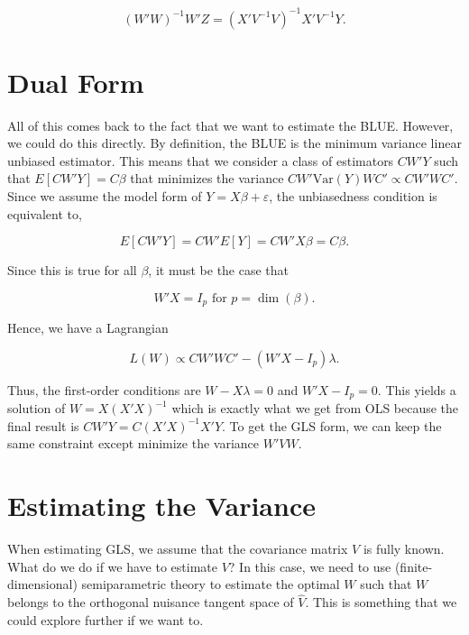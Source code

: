 \documentclass[
  letterpaper,
  DIV=11,
  numbers=noendperiod]{scrartcl}
\newcommand{\Var}{{\text{Var}}}
\begin{document}
\[ (W'W)^{-1} W'Z = (X'V^{-1}V)^{-1} X'V^{-1}Y.\]

\hypertarget{dual-form}{%
\section{Dual Form}\label{dual-form}}

All of this comes back to the fact that we want to estimate the BLUE.
However, we could do this directly. By definition, the BLUE is the
minimum variance linear unbiased estimator. This means that we consider
a class of estimators \(CW'Y\) such that \(E[CW'Y] = C\beta\) that
minimizes the variance \(CW'\Var(Y) WC' \propto CW'WC'\). Since we
assume the model form of \(Y = X\beta + \varepsilon\), the unbiasedness
condition is equivalent to,

\[ E[CW'Y] = CW'E[Y] = CW'X\beta = C\beta. \]

Since this is true for all \(\beta\), it must be the case that

\[ W'X = I_p \text{ for } p = \dim(\beta).\]

Hence, we have a Lagrangian

\[L(W) \propto CW'WC' - (W'X - I_p)\lambda.\]

Thus, the first-order conditions are \(W - X\lambda = 0\) and
\(W'X - I_p = 0\). This yields a solution of \(W = X(X'X)^{-1}\) which
is exactly what we get from OLS because the final result is
\(CW'Y = C(X'X)^{-1} X'Y\). To get the GLS form, we can keep the same
constraint except minimize the variance \(W'VW\).

\hypertarget{estimating-the-variance}{%
\section{Estimating the Variance}\label{estimating-the-variance}}

When estimating GLS, we assume that the covariance matrix \(V\) is fully
known. What do we do if we have to estimate \(V\)? In this case, we need
to use (finite-dimensional) semiparametric theory to estimate the
optimal \(W\) such that \(W\) belongs to the orthogonal nuisance tangent
space of \(\hat V\). This is something that we could explore further if
we want to.
\end{document}
